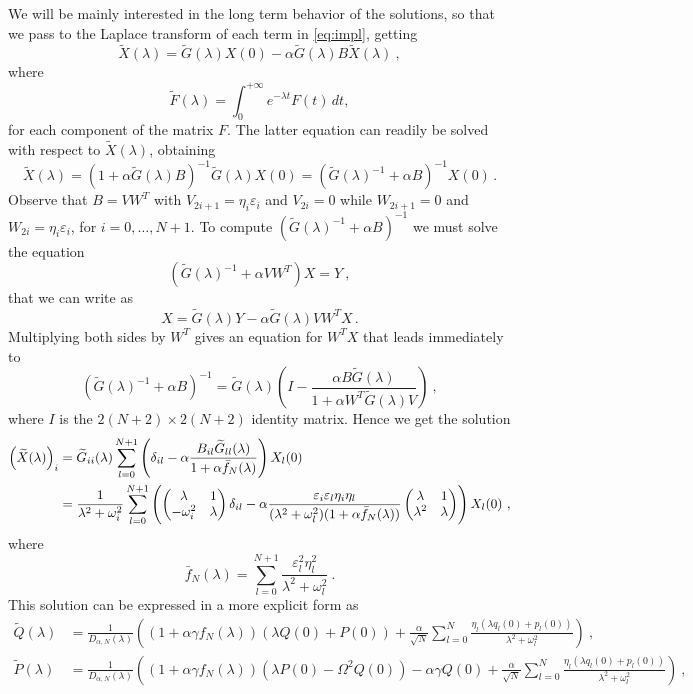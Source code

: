 \documentclass[11pt]{article}
\numberwithin{equation}{section}
\numberwithin{theorem}{section}
\newcommand{\e}{\varepsilon}
\def\tilde#1{\widetilde{#1}}
\begin{document}
We will be mainly interested in the long term behavior of the solutions, so that we pass to the Laplace transform of
each term in \eqref{eq:impl}, getting
\[
\tilde X(\lambda) = \tilde G(\lambda) X(0) -\alpha \tilde G(\lambda)B
\tilde X(\lambda)\ ,
\]
where
\[
\tilde F(\lambda) = \int_0^{+\infty} e^{-\lambda t} F(t) \,dt,
\]
for each component of the matrix $F$. The latter equation can readily be solved with respect to $\tilde X(\lambda)$,
obtaining
\[
\tilde X(\lambda) =\left(1+\alpha \tilde G(\lambda)B\right)^{-1}
\tilde G(\lambda) X(0)=  \left(\tilde G(\lambda)^{-1}+\alpha B\right)^{-1} X(0)\, .
\]
Observe that $B=VW^T$ with $V_{2i+1}=\eta_i\e_i$ and  $V_{2i}=0$ while $W_{2i+1}=0$ and  $W_{2i}=\eta_i\e_i$, for
$i=0,\ldots, N+1$. To compute $\left(\tilde G(\lambda)^{-1}+\alpha B\right)^{-1}$ we must solve the equation
\[
(\tilde G(\lambda)^{-1}+\alpha VW^T) X=Y\ ,
\]
that we can write as
\[
 X=\tilde G(\lambda)Y-\alpha \tilde G(\lambda) VW^T X\, .
\]
Multiplying both sides by $W^T$ gives an equation for $W^T X$ that leads immediately to
\[
\left(\tilde G(\lambda)^{-1}+\alpha B\right)^{-1}=\tilde G(\lambda)
\left(I-\frac{\alpha B \tilde G(\lambda)  }{1+\alpha
W^T\tilde G(\lambda) V}\right)\ ,
\]
where $I$ is the $2(N+2)\times2(N+2)$ identity matrix. Hence we get the solution
\begin{equation*}
\begin{split}
\left(\tilde X(\lambda)\right)_i
&=\tilde G_{ii}(\lambda)\sum_{l=0}^{N+1}\left(\delta_{il}-\alpha
\frac{
B_{il} \tilde G_{ll}(\lambda)}{1+\alpha\bar
f_N(\lambda)}\right)X_l(0)\\
&= \frac{1}{\lambda^2+\omega_i^2} \sum_{l=0}^{N+1}\left(\begin{pmatrix}\lambda &
1\\ -\omega_i^2 & \lambda \end{pmatrix}\delta_{il}-\alpha
\frac{\e_i\e_l\eta_i\eta_l}{(\lambda^2+\omega_l^2)(1+\alpha\bar
f_N(\lambda))}\begin{pmatrix}\lambda& 1\\\lambda^2 &
\lambda\\
\end{pmatrix}\right)X_l(0)\ ,
\end{split}
\end{equation*}
where
\[
 \bar f_N(\lambda)=\sum_{l=0}^{N+1}
  \frac{\e^2_{l}\eta_{l}^{2}}{\lambda^2+\omega_l^2}\ .
\]
This solution can be expressed in a more explicit form as
\begin{equation}\label{eq:sol}
\begin{split}
\tilde Q(\lambda)
&=\frac{1}{D_{\alpha,N}(\lambda)}\left(\left(1+\alpha\gamma f_N(\lambda)\right)
\left(\lambda Q(0)+P(0)\right) +\frac{\alpha}{\sqrt N} \sum_{l=0}^N
\frac{\eta_l(\lambda q_l(0)+p_l(0))}{\lambda^2+\omega_l^2}\right)\ ,\\
\tilde P(\lambda)
&=\frac{1}{D_{\alpha,N}(\lambda)}\left(\left(1+\alpha\gamma f_N(\lambda)\right)
\left(\lambda P(0)-\Omega^2 Q(0)\right)-\alpha\gamma Q(0) +\frac{\alpha}{\sqrt
N} \sum_{l=0}^N
\frac{\eta_l(\lambda q_l(0)+p_l(0))}{\lambda^2+\omega_l^2}\right)\ ,
\end{split}
\end{equation}
\end{document}
